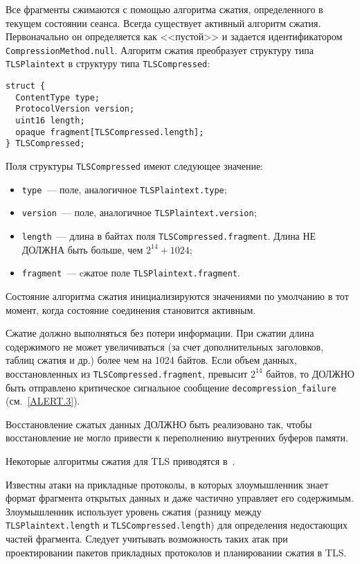 Все фрагменты сжимаются с помощью алгоритма сжатия, определенного в 
текущем состоянии сеанса. Всегда существует активный алгоритм сжатия. 
Первоначально он определяется как <<пустой>> и задается идентификатором 
\lstinline{CompressionMethod.null}.  
Алгоритм сжатия преобразует структуру типа \lstinline{TLSPlaintext} в 
структуру типа \lstinline{TLSCompressed}:
\begin{lstlisting}
struct {
  ContentType type;
  ProtocolVersion version;
  uint16 length;
  opaque fragment[TLSCompressed.length];
} TLSCompressed;
\end{lstlisting}

Поля структуры \lstinline{TLSCompressed} имеют следующее значение:
\begin{itemize}
\item[--]
\lstinline{type}~--- поле, аналогичное \lstinline{TLSPlaintext.type};

\item[--]
\lstinline{version}~--- поле, аналогичное \lstinline{TLSPlaintext.version};

\item[--]
\lstinline{length}~--- длина в байтах поля 
\lstinline{TLSCompressed.fragment}. Длина НЕ ДОЛЖНА быть больше, чем 
$2^{14} + 1024$; 
\item[--]
\lstinline{fragment}~--- cжатое поле \lstinline{TLSPlaintext.fragment}.
\end{itemize}

Состояние алгоритма сжатия инициализируются значениями по умолчанию в тот 
момент, когда состояние соединения становится активным. 

Сжатие должно выполняться без потери информации. При сжатии длина 
содержимого не может увеличиваться (за счет дополнительных заголовков, 
таблиц сжатия и др.) более чем на 1024 байтов. Если объем данных, 
восстановленных из \lstinline{TLSCompressed.fragment}, превысит $2^{14}$ 
байтов, то ДОЛЖНО быть отправлено критическое сигнальное сообщение 
\lstinline{decompression_failure} (см.~\ref{ALERT.3}). 

Восстановление сжатых данных ДОЛЖНО быть реализовано так, чтобы 
восстановление не могло привести к переполнению внутренних буферов памяти. 

\begin{note}
Некоторые алгоритмы сжатия для TLS приводятся в~\cite{RFC3749}. 
\end{note}

\begin{note}
Известны атаки на прикладные протоколы, в которых злоумышленник знает формат
фрагмента открытых данных и даже частично управляет его содержимым.
Злоумышленник использует уровень сжатия (разницу между
\lstinline{TLSPlaintext.length} и \lstinline{TLSCompressed.length}) для
определения недостающих частей фрагмента. Следует учитывать возможность таких
атак при проектировании пакетов прикладных протоколов и планировании сжатия в
TLS.
\end{note}
 
